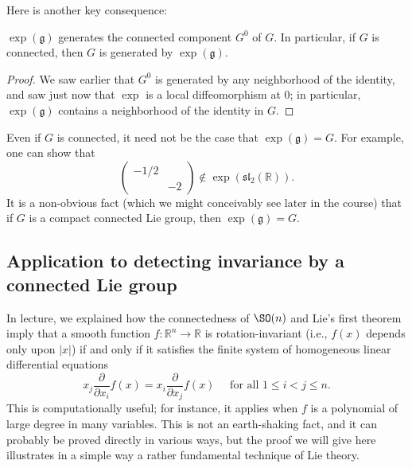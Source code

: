 \documentclass[reqno]{amsart} 
\begin{document}
Here is another key consequence:
\begin{corollary}\label{cor:connected-component-generated-by-exp}
  $\exp(\mathfrak{g})$ generates the connected component $G^0$ of $G$.
  In particular, if $G$ is connected, then $G$ is generated by $\exp(\mathfrak{g})$.
\end{corollary}
\begin{proof}
  We saw earlier that $G^0$ is generated by any neighborhood
  of the identity,
  and saw just now that $\exp$ is a local diffeomorphism
  at $0$;
  in particular, $\exp(\mathfrak{g})$ contains a neighborhood
  of the identity in $G$.
\end{proof}
\begin{remark}\label{rmk:exp-need-not-surject}
  Even if $G$ is connected, it need not be the case that
  $\exp(\mathfrak{g}) = G$.
  For example, one can show that
  \begin{equation*}
    \begin{pmatrix}
      -1/2 &  \\
       & -2
    \end{pmatrix}
 \notin \exp(\mathfrak{s} \mathfrak{l} _2(\mathbb{R})).
  \end{equation*}
  It is a non-obvious fact (which we might conceivably see later
  in the course)
  that if $G$ is a compact connected  Lie group,
  then $\exp(\mathfrak{g}) = G$.
\end{remark}

\subsection{Application to detecting invariance by a connected Lie group\label{sec:appl-inv-by-connected}}
\label{sec:org4b91333}
In lecture, we explained how the connectedness of $\SO(n)$
and Lie's first theorem
imply that a smooth function
$f : \mathbb{R}^n \rightarrow \mathbb{R}$
is rotation-invariant (i.e., $f(x)$ depends only upon $|x|$)
if and only if it satisfies the finite system
of homogeneous linear differential equations
\begin{equation}\label{eqn:pdes-characterizing-rotation-invariance}
  x_j \frac{\partial }{\partial x_i} f(x)
  = 
  x_i \frac{\partial }{\partial x_j} f(x)
  \quad \text{ for all }
  1 \leq i < j \leq n.
\end{equation}
This is computationally useful; for instance, it applies when $f$ is a polynomial of large degree in many variables.
This is not an earth-shaking fact, and it can probably be proved
directly in various ways, but the proof we will give here
illustrates in a simple way a rather fundamental technique of Lie theory.
\end{document}
